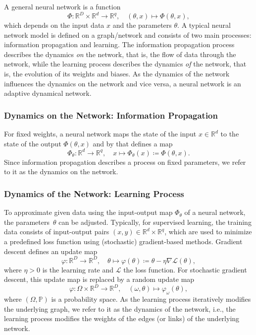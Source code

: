 \documentclass[10pt]{article}
\newcommand{\R}{{\mathbb R}}
\def\R{\mathbb{R}}
\begin{document}
A general neural network is a function
\begin{equation}\label{cekk_eq:neural_network}
	\Phi: \R^D \times \R^d \rightarrow \R^q, \quad (\theta, x) \mapsto \Phi(\theta,x),
\end{equation}
which depends on the input data $x$ and the parameters $\theta$. A typical neural network model is defined on a graph/network and consists of two main processes: information propagation and learning. The information propagation process describes the dynamics \emph{on} the network, that is, the flow of data through the network, while the learning process describes the dynamics \emph{of} the network, that is, the evolution of its weights and biases. As the dynamics of the network influences the dynamics on the network and vice versa, a neural network is an adaptive dynamical network.

\subsubsection*{Dynamics on the Network: Information Propagation}

For fixed weights, a neural network maps the state of the input $x\in\R^d$ to the state of the output $\Phi(\theta,x)$ and by that defines a map
\begin{equation}\label{cekk_eq:input_output_map}
	\Phi_\theta: \R^d \rightarrow \R^q, \quad x \mapsto \Phi_\theta(x) \coloneqq \Phi(\theta,x).
\end{equation}
Since information propagation describes a process on fixed parameters, we refer to it as the dynamics on the network.

\subsubsection*{Dynamics of the Network: Learning Process}

To approximate given data using the input-output map $\Phi_\theta$ of a neural network, the parameters~$\theta$ can be adjusted. Typically, for supervised learning, the training data consists of input-output pairs $(x, y)\in\R^d\times\R^q$, which are used to minimize a predefined loss function using (stochastic) gradient-based methods. Gradient descent defines an update map
$$\varphi: \mathbb R^D \to \mathbb R^D,\quad \theta \mapsto \varphi(\theta) \coloneqq \theta - \eta \nabla \mathcal L(\theta),$$
where $\eta>0$ is the learning rate and $\mathcal L$ the loss function. For stochastic gradient descent, this update map is replaced by a random update map
$$\varphi: \Omega \times \mathbb R^D \to \mathbb R^D,\quad (\omega,\theta) \mapsto \varphi_\omega(\theta),$$
where $(\Omega,\mathbb P)$ is a probability space. As the learning process iteratively modifies the underlying graph, we refer to it as the dynamics of the network, i.e., the learning process modifies the weights of the edges (or links) of the underlying network.
\end{document}
